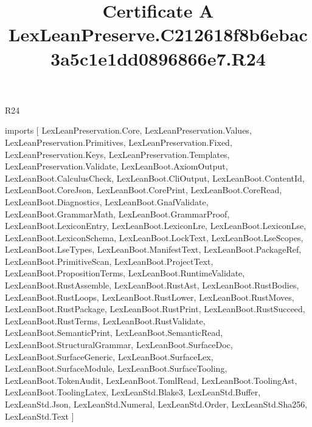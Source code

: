 \begin{lexlean}{R24}
\title{Certificate A LexLeanPreserve.C212618f8b6ebac3a5c1e1dd0896866e7.R24}
\begin{coremodule}
imports [
  LexLeanPreservation.Core,
  LexLeanPreservation.Values,
  LexLeanPreservation.Primitives,
  LexLeanPreservation.Fixed,
  LexLeanPreservation.Keys,
  LexLeanPreservation.Templates,
  LexLeanPreservation.Validate,
  LexLeanBoot.AxiomOutput,
  LexLeanBoot.CalculusCheck,
  LexLeanBoot.CliOutput,
  LexLeanBoot.ContentId,
  LexLeanBoot.CoreJson,
  LexLeanBoot.CorePrint,
  LexLeanBoot.CoreRead,
  LexLeanBoot.Diagnostics,
  LexLeanBoot.GnafValidate,
  LexLeanBoot.GrammarMath,
  LexLeanBoot.GrammarProof,
  LexLeanBoot.LexiconEntry,
  LexLeanBoot.LexiconLre,
  LexLeanBoot.LexiconLse,
  LexLeanBoot.LexiconSchema,
  LexLeanBoot.LockText,
  LexLeanBoot.LseScopes,
  LexLeanBoot.LseTypes,
  LexLeanBoot.ManifestText,
  LexLeanBoot.PackageRef,
  LexLeanBoot.PrimitiveScan,
  LexLeanBoot.ProjectText,
  LexLeanBoot.PropositionTerms,
  LexLeanBoot.RuntimeValidate,
  LexLeanBoot.RustAssemble,
  LexLeanBoot.RustAst,
  LexLeanBoot.RustBodies,
  LexLeanBoot.RustLoops,
  LexLeanBoot.RustLower,
  LexLeanBoot.RustMoves,
  LexLeanBoot.RustPackage,
  LexLeanBoot.RustPrint,
  LexLeanBoot.RustSucceed,
  LexLeanBoot.RustTerms,
  LexLeanBoot.RustValidate,
  LexLeanBoot.SemanticPrint,
  LexLeanBoot.SemanticRead,
  LexLeanBoot.StructuralGrammar,
  LexLeanBoot.SurfaceDoc,
  LexLeanBoot.SurfaceGeneric,
  LexLeanBoot.SurfaceLex,
  LexLeanBoot.SurfaceModule,
  LexLeanBoot.SurfaceTooling,
  LexLeanBoot.TokenAudit,
  LexLeanBoot.TomlRead,
  LexLeanBoot.ToolingAst,
  LexLeanBoot.ToolingLatex,
  LexLeanStd.Blake3,
  LexLeanStd.Buffer,
  LexLeanStd.Json,
  LexLeanStd.Numeral,
  LexLeanStd.Order,
  LexLeanStd.Sha256,
  LexLeanStd.Text
]


\end{coremodule}
\end{lexlean}
